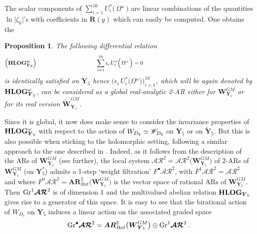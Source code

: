 \documentclass[11pt]{amsart}
\newtheorem{prop}[thm]{Proposition}
\begin{document}
 The scalar components of $\sum_{i=1}^{10} 
 U_{i}^*\big( \,\Omega^\omega\,\big)$ are linear combinations
 of the quantities $\ln\lvert \zeta_k \lvert$'s with coefficients in $\mathbf R(y)$ which can easily be computed. One obtains the 
\begin{prop}
 The following differential relation 
$$
\boldsymbol{\Big( {\bf HLOG}_{ \boldsymbol{Y}_5}^\omega\Big)}
\hspace{3.8cm}
\sum_{i=1}^{10} 
  \epsilon_i\, U_{i}^*\Big( \,\Omega^\omega\,\Big)=0
\hspace{7cm} {}^{} 
$$
 is identically satisfied on $\boldsymbol{Y}_5$ 
 hence 
 $\Big(  \epsilon_i\, U_{i}^*\big(\Omega^\omega \big)\Big)_{i=1}^{10}$, 
which will be again denoted by $ {\bf HLOG}^\omega_{ \boldsymbol{Y}_5}$, can be considered as a global real-analytic 2-AR either for 
${\boldsymbol{W}}^{GM}_{\boldsymbol{Y}_5}$ or for its real version 
$\widetilde{\boldsymbol{W}}^{GM}_{\boldsymbol{Y}_5}$.
\end{prop}
Since it is global, it now does make sense to 
consider the invariance properties of 
  $ {\bf HLOG}^\omega_{ \boldsymbol{Y}_5}$
with respect to the action of $W_{D_5}
\simeq  \boldsymbol{\mathscr W}_{\hspace{-0.1cm}D_5}$ on $\boldsymbol{Y}_5$ or on $\widetilde{\boldsymbol{Y}}_5$. But this is also possible 
when sticking to the holomorphic setting, 
 following a similar approach to the one described in \cite[p.\,96]{PirioWM06}. 
Indeed, as it follows from the description of the ARs of 
$\boldsymbol{W}^{GM}_{\boldsymbol{Y}_5}$ (see further), 
 the local system $\boldsymbol{\mathcal A\mathcal R}^2=\boldsymbol{\mathcal A\mathcal R}^2\big( \boldsymbol{W}^{GM}_{\boldsymbol{Y}_5} \big)$ of 2-ARs of ${\boldsymbol{W}}^{GM}_{\boldsymbol{Y}_5}$ (on 
$\boldsymbol{Y}^*_5$)  
 admits a 1-step `weight filtration' 
$F^\bullet  \boldsymbol{\mathcal A\mathcal R}^2$, with 
 $F^1  \boldsymbol{\mathcal A\mathcal R}^2= \boldsymbol{\mathcal A\mathcal R}^2$ and where $F^0 \boldsymbol{\mathcal A\mathcal R}^2=
\boldsymbol{AR}_{Rat}^2\big( \boldsymbol{W}^{GM}_{\boldsymbol{Y}_5} \big)
$ is the vector space of rational ARs of $\boldsymbol{W}^{GM}_{\boldsymbol{Y}_5}$. Then ${\rm Gr}^1  \boldsymbol{\mathcal A\mathcal R}^2$ is of dimension 1 and the multivalued abelian relation $ {\bf HLOG}_{ \boldsymbol{Y}_5}$ gives rise to a generator of this space.  It is easy to see that the birational action of $W_{D_5}$ on 
$\boldsymbol{Y}_5$ induces a linear action on 
the associated graded space 
$${\rm Gr}^\bullet  \boldsymbol{\mathcal A\mathcal R}^2=\boldsymbol{AR}_{Rat}^2\big( \boldsymbol{W}^{GM}_{\boldsymbol{Y}_5} \big)
\oplus {\rm Gr}^1  \boldsymbol{\mathcal A\mathcal R}^2\, .$$ 
\end{document}
